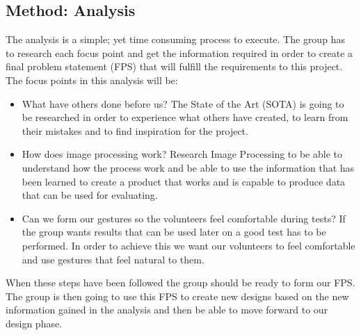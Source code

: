 \subsection{Method: Analysis}
The analysis is a simple; yet time consuming process to execute. The group has to research each focus point and get the information required in order to create a final problem statement (FPS) that will fulfill the requirements to this project. The focus points in this analysis will be:

\begin{itemize}
\item What have others done before us? \newline
The State of the Art (SOTA) is going to be researched in order to experience what others have created, to learn from their mistakes and to find inspiration for the project. 

\item How does image processing work? \newline
Research Image Processing to be able to understand how the process work and be able to use the information that has been learned to create a product that works and is capable to produce data that can be used for evaluating.

\item Can we form our gestures so the volunteers feel comfortable during tests? \newline
If the group wants results that can be used later on a good test has to be performed. In order to achieve this we want our volunteers to feel comfortable and use gestures that feel natural to them. 
\end{itemize} 

\pagebreak[1]
When these steps have been followed the group should be ready to form our FPS. The group is then going to use this FPS to create new designs based on the new information gained in the analysis and then be able to move forward to our design phase. 
